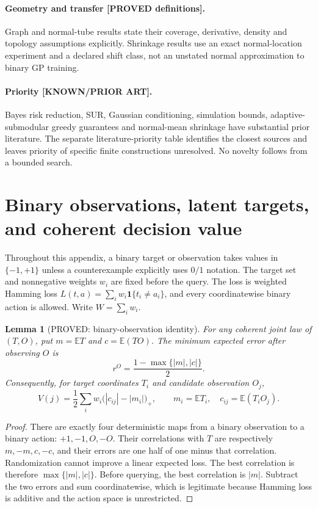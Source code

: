 \documentclass[11pt]{article}
\newtheorem{lemma}[theorem]{Lemma}
\theoremstyle{definition}
\theoremstyle{remark}
\begin{document}
\paragraph{Geometry and transfer [PROVED definitions].}
Graph and normal-tube results state their coverage, derivative,
density and topology assumptions explicitly. Shrinkage results use an
exact normal-location experiment and a declared shift class, not an
unstated normal approximation to binary GP training.
\paragraph{Priority [KNOWN/PRIOR ART].}
Bayes risk reduction, SUR, Gaussian conditioning, simulation bounds,
adaptive-submodular greedy guarantees and normal-mean shrinkage have
substantial prior literature. The separate literature-priority table
identifies the closest sources and leaves priority of specific finite
constructions unresolved. No novelty follows from a bounded search.

\section{Binary observations, latent targets, and coherent decision value}

Throughout this appendix, a binary target or observation takes values in
$\{-1,+1\}$ unless a counterexample explicitly uses $0/1$ notation.
The target set and nonnegative weights $w_i$ are fixed before the query.
The loss is weighted Hamming loss
$L(t,a)=\sum_i w_i\mathbf{1}\{t_i\ne a_i\}$, and every coordinatewise
binary action is allowed. Write $W=\sum_i w_i$.

\begin{lemma}[PROVED: binary-observation identity]
\label{lem:binary-observation-r3}
For any coherent joint law of $(T,O)$, put
$m=\mathbb{E}T$ and $c=\mathbb{E}(TO)$. The minimum expected error after
observing $O$ is
\[
 r^O=\frac{1-\max\{|m|,|c|\}}{2}.
\]
Consequently, for target coordinates $T_i$ and candidate observation $O_j$,
\[
 V(j)=\frac12\sum_i w_i\bigl(|c_{ij}|-|m_i|\bigr)_+,
 \qquad m_i=\mathbb{E}T_i,\quad c_{ij}=\mathbb{E}(T_iO_j).
\]
\end{lemma}
\begin{proof}
There are exactly four deterministic maps from a binary observation to a
binary action: $+1,-1,O,-O$. Their correlations with $T$ are respectively
$m,-m,c,-c$, and their errors are one half of one minus that correlation.
Randomization cannot improve a linear expected loss. The best correlation
is therefore $\max\{|m|,|c|\}$. Before querying, the best correlation is
$|m|$. Subtract the two errors and sum coordinatewise, which is legitimate
because Hamming loss is additive and the action space is unrestricted.
\end{proof}
\end{document}
